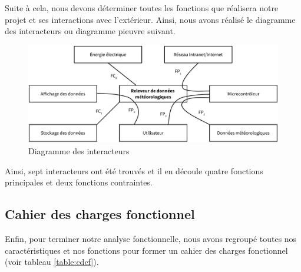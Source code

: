 Suite à cela, nous devons déterminer toutes les fonctions que réalisera notre projet et ses interactions avec l'extérieur. Ainsi, nous avons réalisé le diagramme des interacteurs ou diagramme \og pieuvre \fg{} suivant.

\begin{figure}[!h]
	\centering
	\includegraphics[width=\linewidth]{Images/Diagramme_pieuvre}
	\caption{Diagramme des interacteurs}
\end{figure}

Ainsi, sept interacteurs ont été trouvés et il en découle quatre fonctions principales et deux fonctions contraintes.

\subsection{Cahier des charges fonctionnel}

Enfin, pour terminer notre analyse fonctionnelle, nous avons regroupé toutes nos caractéristiques et nos fonctions pour former un cahier des charges fonctionnel (voir tableau \ref{table:cdcf}).


